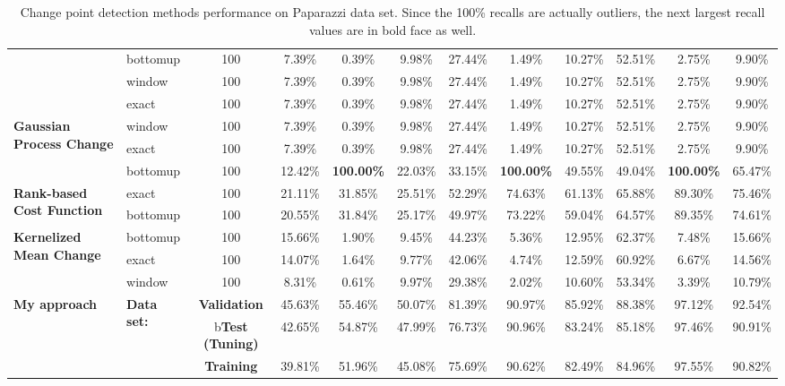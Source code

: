 \begin{table}
{\begin{tabular}{llcccccccccc}
    & bottomup & 100  &        7.39\% &     0.39\% &  9.98\% &        27.44\% &      1.49\% & 10.27\% &        52.51\% &      2.75\% &  9.90\% \\
    & window & 100  &        7.39\% &     0.39\% &  9.98\% &        27.44\% &      1.49\% & 10.27\% &        52.51\% &      2.75\% &  9.90\% \\
    & exact & 100  &        7.39\% &     0.39\% &  9.98\% &        27.44\% &      1.49\% & 10.27\% &        52.51\% &      2.75\% &  9.90\% \\ \midrule
\multirow{3}{*}{\textbf{Gaussian Process Change}}
    & window & 100  &        7.39\% &     0.39\% &  9.98\% &        27.44\% &      1.49\% & 10.27\% &        52.51\% &      2.75\% &  9.90\% \\
    & exact & 100  &        7.39\% &     0.39\% &  9.98\% &        27.44\% &      1.49\% & 10.27\% &        52.51\% &      2.75\% &  9.90\% \\
    & bottomup & 100  &       12.42\% &   \textbf{100.00\%} & 22.03\% &        33.15\% &    \textbf{100.00\%} & 49.55\% &        49.04\% &    \textbf{100.00\%} & 65.47\% \\ \midrule
\multirow{2}{*}{\textbf{Rank-based Cost Function}}
    & exact & 100  &       21.11\% &    31.85\% & 25.51\% &        52.29\% &     74.63\% & 61.13\% &        65.88\% &     89.30\% & 75.46\% \\
    & bottomup & 100  &       20.55\% &    31.84\% & 25.17\% &        49.97\% &     73.22\% & 59.04\% &        64.57\% &     89.35\% & 74.61\% \\ \midrule
\multirow{3}{*}{\textbf{Kernelized Mean Change}} 
    & bottomup & 100  &       15.66\% &     1.90\% &  9.45\% &        44.23\% &      5.36\% & 12.95\% &        62.37\% &      7.48\% & 15.66\% \\
    & exact & 100  &       14.07\% &     1.64\% &  9.77\% &        42.06\% &      4.74\% & 12.59\% &        60.92\% &      6.67\% & 14.56\% \\
    & window & 100  &        8.31\% &     0.61\% &  9.97\% &        29.38\% &      2.02\% & 10.60\% &        53.34\% &      3.39\% & 10.79\% \\ \midrule \midrule
\multirow{3}{*}{\textbf{My approach}} 
    & \multirow{3}{*}{\textbf{Data set:}}  
         & \textbf{Validation} &  45.63\% &    55.46\% & 50.07\% &   81.39\% &     90.97\% & 85.92\% &   88.38\% &     97.12\% & 92.54\%  \\
    & {} & b\textbf{Test (Tuning)} &  42.65\% &    54.87\% & 47.99\% &   76.73\% &     90.96\% & 83.24\% &   85.18\% &     97.46\% & 90.91\%  \\
    & {} & \textbf{Training}  &  39.81\% &    51.96\% & 45.08\% &   75.69\% &     90.62\% & 82.49\% &   84.96\% &     97.55\% & 90.82\%  \\
\bottomrule
\end{tabular}%
}
    \caption{Change point detection methods performance on Paparazzi data set. Since the 100\% recalls are actually outliers, the next largest recall values are in bold face as well.}
    \label{tab:cpd_paparazzi}
\end{table}


